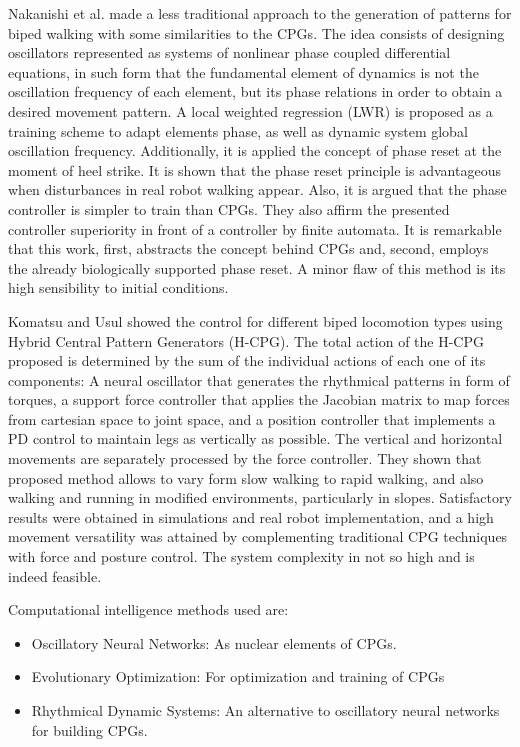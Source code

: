 Nakanishi et al. \cite{Nakanishi2004b} made a less traditional approach to the generation of patterns for biped walking with some similarities to the CPGs. The idea consists of designing oscillators represented as systems of nonlinear phase coupled differential equations, in such form that the fundamental element of dynamics is not the oscillation frequency of each element, but its phase relations in order to obtain a desired movement pattern. A local weighted regression (LWR) is proposed as a training scheme to adapt elements phase, as well as dynamic system global oscillation frequency. Additionally, it is applied the concept of phase reset at the moment of heel strike. It is shown that the phase reset principle is advantageous when disturbances in real robot walking appear. Also, it is argued that the phase controller is simpler to train than CPGs. They also affirm the presented controller superiority in front of a controller by finite automata. It is remarkable that this work, first, abstracts the concept behind CPGs and, second, employs the already biologically supported phase reset. A minor flaw of this method is its high sensibility to initial conditions.


Komatsu and Usul \cite{Komatsu05Dynamic} showed the control for different biped locomotion types using Hybrid Central Pattern Generators (H-CPG). The total action of the H-CPG proposed is determined by the sum of the individual actions of each one of its components: A neural oscillator that generates the rhythmical patterns in form of torques, a support force controller that applies the Jacobian matrix to map forces from cartesian space to joint space, and a position controller that implements a PD control to maintain legs as vertically as possible. The vertical and horizontal movements are separately processed by the force controller. They shown that proposed method allows to vary form slow walking to rapid walking, and also walking and running in modified environments, particularly in slopes. Satisfactory results were obtained in simulations and real robot implementation, and a high movement versatility was attained by complementing traditional CPG techniques with force and posture control. The system complexity in not so high and is indeed feasible.

Computational intelligence methods used are:
\begin{itemize}
\item Oscillatory Neural Networks: As nuclear elements of CPGs.
\item Evolutionary Optimization: For optimization and training of CPGs
\item Rhythmical Dynamic Systems: An alternative to oscillatory neural networks for building CPGs.
\end{itemize}
